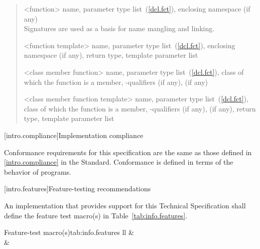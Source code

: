 \begin{quote}
%
<function> name, parameter type list~(\ref{dcl.fct}),  enclosing 
namespace (if any)\\
\enternote Signatures are used as a basis for
name mangling and linking.\exitnote

%
<function template> name, parameter type list~(\ref{dcl.fct}), enclosing namespace (if any),
return type,  template parameter list

%
<class member function> name, parameter type list~(\ref{dcl.fct}), class of which the
function is a member, \cv-qualifiers (if any),
  (if any)

%
<class member function template> name, parameter type list~(\ref{dcl.fct}), class of which the
function is a member, \cv-qualifiers (if any),
 (if any), return type,  template 
parameter list
\end{quote}

[intro.compliance]{Implementation compliance}

\pnum
Conformance requirements for this specification are the same as those 
defined in \ref{intro.compliance} in the \Cpp Standard.
\enternote 
Conformance is defined in terms of the behavior of programs.
\exitnote

[intro.features]{Feature-testing recommendations}

\pnum
An implementation that provides support for this Technical Specification shall 
define the feature test macro(s) in Table~\ref{tab:info.features}.

\begin{floattable}{Feature-test macro(s)}{tab:info.features}
{ll}
\topline
{} &  \\
\capsep
{}  &       \\
\end{floattable}


